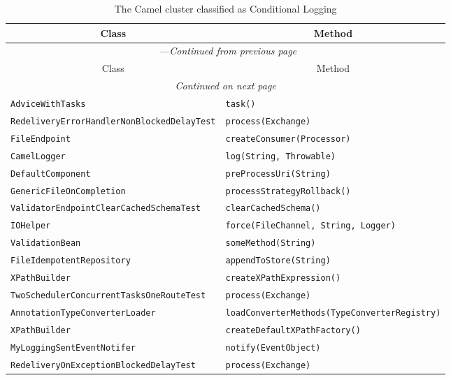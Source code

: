 \begin{center}
\begin{longtable}{ll}
\caption{The Camel cluster classified as Conditional Logging}\\
\toprule\multicolumn{1}{c}{Class}&\multicolumn{1}{c}{Method}\\\midrule
\endfirsthead

\multicolumn{2}{c}{\tablename\ \thetable{}---\textit{Continued from previous page}} \\\midrule
\multicolumn{1}{c}{Class}&\multicolumn{1}{c}{Method}\\\midrule
\endhead
\multicolumn{2}{c}{\textit{Continued on next page}}\\\midrule
\endfoot
\bottomrule
\endlastfoot

\lstinline/AdviceWithTasks/&{\lstinline/task()/}\\
\lstinline/RedeliveryErrorHandlerNonBlockedDelayTest/&{\lstinline/process(Exchange)/}\\
\lstinline/FileEndpoint/&{\lstinline/createConsumer(Processor)/}\\
\lstinline/CamelLogger/&{\lstinline/log(String, Throwable)/}\\
\lstinline/DefaultComponent/&{\lstinline/preProcessUri(String)/}\\
\lstinline/GenericFileOnCompletion/&{\lstinline/processStrategyRollback()/}\\
\lstinline/ValidatorEndpointClearCachedSchemaTest/&{\lstinline/clearCachedSchema()/}\\
\lstinline/IOHelper/&{\lstinline/force(FileChannel, String, Logger)/}\\
\lstinline/ValidationBean/&{\lstinline/someMethod(String)/}\\
\lstinline/FileIdempotentRepository/&{\lstinline/appendToStore(String)/}\\
\lstinline/XPathBuilder/&{\lstinline/createXPathExpression()/}\\
\lstinline/TwoSchedulerConcurrentTasksOneRouteTest/&{\lstinline/process(Exchange)/}\\
\lstinline/AnnotationTypeConverterLoader/&{\lstinline/loadConverterMethods(TypeConverterRegistry)/}\\
\lstinline/XPathBuilder/&{\lstinline/createDefaultXPathFactory()/}\\
\lstinline/MyLoggingSentEventNotifer/&{\lstinline/notify(EventObject)/}\\
\lstinline/RedeliveryOnExceptionBlockedDelayTest/&{\lstinline/process(Exchange)/}\\

\end{longtable}
\end{center}
